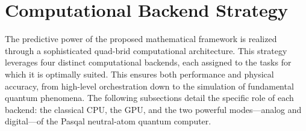 \section{Computational Backend Strategy}
The predictive power of the proposed mathematical framework is realized through a sophisticated quad-brid computational architecture. This strategy leverages four distinct computational backends, each assigned to the tasks for which it is optimally suited. This ensures both performance and physical accuracy, from high-level orchestration down to the simulation of fundamental quantum phenomena. The following subsections detail the specific role of each backend: the classical CPU, the GPU, and the two powerful modes---analog and digital---of the Pasqal neutral-atom quantum computer.





